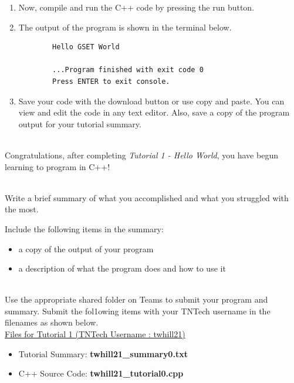 \documentclass[12pt]{article}
\begin{document}
\begin{description}[labelindent=1cm]
\begin{enumerate}
		\item Now, compile and run the C++ code by pressing the run button.
		
		\item	
		The output of the program is shown in the terminal below.
		\begin{verbatim} 
		Hello GSET World
		
		...Program finished with exit code 0
		Press ENTER to exit console.
		\end{verbatim}
	
		\item Save your code with the download button or use copy and paste. You can view and edit the code in any text editor. Also, save a copy of the program output for your tutorial summary. 

	\end{enumerate}

\item[\textbf{\underline{Tutorial Complete:}}] \hfill \vspace{3mm}\\ 
	Congratulations, after completing {\it Tutorial 1 - Hello World}, you have begun learning to program in C++! \\


\newpage
\item[\textbf{\underline{Tutorial Summary:}}] \hfill \vspace{3mm}\\ 
Write a brief summary of what you accomplished and what you struggled with the most. 

Include the following items in the summary:
\begin{itemize}

\item a copy of the output of your program
\item a description of what the program does and how to use it

\end{itemize}


\item[\textbf{\underline{Submission on Teams:}}] \hfill \vspace{3mm}\\ 
Use the appropriate shared folder on Teams to submit your program and summary. Submit the fol1owing items with your TNTech username in the filenames as shown below. \vspace{0mm}\\

\underline{Files for Tutorial 1 (TNTech Username : twhill21)}

\begin{itemize}

\item Tutorial Summary: \textbf{ twhill21\_summary0.txt}

\item C++ Source Code: \textbf{ twhill21\_tutorial0.cpp}

\end{itemize}


\end{description}
\end{document}
